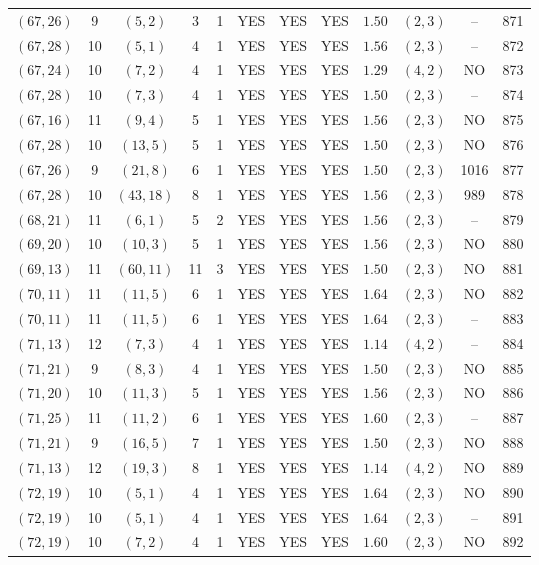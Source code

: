 \begin{longtable}{|c|c|c|c|c|c|c|c|c|c|c|c|}
$(67,26)$ & 9 & $(5,2)$ & 3 & 1 & YES & YES & YES & $1.50$ & $(2,3)$ & -- & 871\\
$(67,28)$ & 10 & $(5,1)$ & 4 & 1 & YES & YES & YES & $1.56$ & $(2,3)$ & -- & 872\\
$(67,24)$ & 10 & $(7,2)$ & 4 & 1 & YES & YES & YES & $1.29$ & $(4,2)$ & NO & 873\\
$(67,28)$ & 10 & $(7,3)$ & 4 & 1 & YES & YES & YES & $1.50$ & $(2,3)$ & -- & 874\\
$(67,16)$ & 11 & $(9,4)$ & 5 & 1 & YES & YES & YES & $1.56$ & $(2,3)$ & NO & 875\\
$(67,28)$ & 10 & $(13,5)$ & 5 & 1 & YES & YES & YES & $1.50$ & $(2,3)$ & NO & 876\\
$(67,26)$ & 9 & $(21,8)$ & 6 & 1 & YES & YES & YES & $1.50$ & $(2,3)$ & 1016 & 877\\
$(67,28)$ & 10 & $(43,18)$ & 8 & 1 & YES & YES & YES & $1.56$ & $(2,3)$ & 989 & 878\\
$(68,21)$ & 11 & $(6,1)$ & 5 & 2 & YES & YES & YES & $1.56$ & $(2,3)$ & -- & 879\\
$(69,20)$ & 10 & $(10,3)$ & 5 & 1 & YES & YES & YES & $1.56$ & $(2,3)$ & NO & 880\\
$(69,13)$ & 11 & $(60,11)$ & 11 & 3 & YES & YES & YES & $1.50$ & $(2,3)$ & NO & 881\\
$(70,11)$ & 11 & $(11,5)$ & 6 & 1 & YES & YES & YES & $1.64$ & $(2,3)$ & NO & 882\\
$(70,11)$ & 11 & $(11,5)$ & 6 & 1 & YES & YES & YES & $1.64$ & $(2,3)$ & -- & 883\\
$(71,13)$ & 12 & $(7,3)$ & 4 & 1 & YES & YES & YES & $1.14$ & $(4,2)$ & -- & 884\\
$(71,21)$ & 9 & $(8,3)$ & 4 & 1 & YES & YES & YES & $1.50$ & $(2,3)$ & NO & 885\\
$(71,20)$ & 10 & $(11,3)$ & 5 & 1 & YES & YES & YES & $1.56$ & $(2,3)$ & NO & 886\\
$(71,25)$ & 11 & $(11,2)$ & 6 & 1 & YES & YES & YES & $1.60$ & $(2,3)$ & -- & 887\\
$(71,21)$ & 9 & $(16,5)$ & 7 & 1 & YES & YES & YES & $1.50$ & $(2,3)$ & NO & 888\\
$(71,13)$ & 12 & $(19,3)$ & 8 & 1 & YES & YES & YES & $1.14$ & $(4,2)$ & NO & 889\\
$(72,19)$ & 10 & $(5,1)$ & 4 & 1 & YES & YES & YES & $1.64$ & $(2,3)$ & NO & 890\\
$(72,19)$ & 10 & $(5,1)$ & 4 & 1 & YES & YES & YES & $1.64$ & $(2,3)$ & -- & 891\\
$(72,19)$ & 10 & $(7,2)$ & 4 & 1 & YES & YES & YES & $1.60$ & $(2,3)$ & NO & 892\\

\end{longtable}
